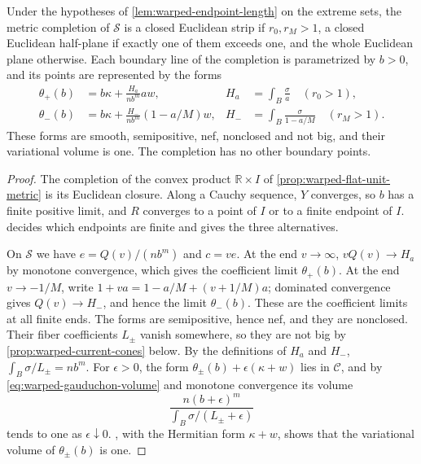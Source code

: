 \begin{theorem}\label{thm:warped-unit-volume-completion}
Under the hypotheses of \cref{lem:warped-endpoint-length} on the extreme sets, the metric completion of $\mathscr S$ is a closed Euclidean strip if $r_0,r_M>1$, a closed Euclidean half-plane if exactly one of them exceeds one, and the whole Euclidean plane otherwise. Each boundary line of the completion is parametrized by $b>0$, and its points are represented by the forms
\begin{align*}
 \theta_+(b)&=b\kappa+\frac{H_a}{nb^m}a w,
 &H_a&=\int_B\frac{\sigma}{a}\quad(r_0>1),\\
 \theta_-(b)&=b\kappa+\frac{H_-}{nb^m}(1-a/M)w,
 &H_-&=\int_B\frac{\sigma}{1-a/M}\quad(r_M>1).
\end{align*}
These forms are smooth, semipositive, nef, nonclosed and not big, and their variational volume is one. The completion has no other boundary points.
\end{theorem}
\begin{proof}
The completion of the convex product $\mathbb R\times I$ of \cref{prop:warped-flat-unit-metric} is its Euclidean closure. Along a Cauchy sequence, $Y$ converges, so $b$ has a finite positive limit, and $R$ converges to a point of $I$ or to a finite endpoint of $I$.  decides which endpoints are finite and gives the three alternatives.

On $\mathscr S$ we have $e=Q(v)/(nb^m)$ and $c=ve$. At the end $v\to\infty$, $vQ(v)\to H_a$ by monotone convergence, which gives the coefficient limit $\theta_+(b)$. At the end $v\to-1/M$, write $1+va=1-a/M+(v+1/M)a$; dominated convergence gives $Q(v)\to H_-$, and hence the limit $\theta_-(b)$. These are the coefficient limits at all finite ends. The forms are semipositive, hence nef, and they are nonclosed. Their fiber coefficients $L_\pm$ vanish somewhere, so they are not big by \cref{prop:warped-current-cones} below. By the definitions of $H_a$ and $H_-$, $\int_B\sigma/L_\pm=nb^m$. For $\epsilon>0$, the form $\theta_\pm(b)+\epsilon(\kappa+w)$ lies in $\mathscr C$, and by \eqref{eq:warped-gauduchon-volume} and monotone convergence its volume
\[
 \frac{n(b+\epsilon)^m}{\int_B\sigma/(L_\pm+\epsilon)}
\]
tends to one as $\epsilon\downarrow0$. , with the Hermitian form $\kappa+w$, shows that the variational volume of $\theta_\pm(b)$ is one.
\end{proof}

